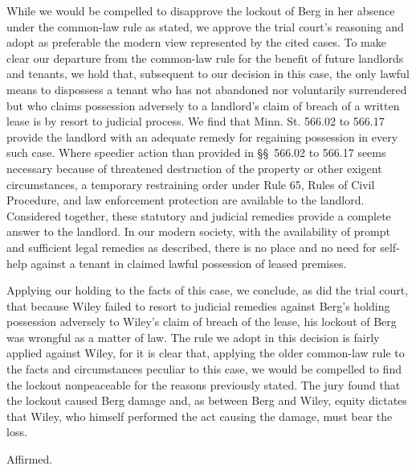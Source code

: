 While we would be compelled to disapprove the lockout of Berg in her absence
under the common-law rule as stated, we approve the trial court's reasoning and
adopt as preferable the modern view represented by the cited cases. To make
clear our departure from the common-law rule for the benefit of future
landlords and tenants, we hold that, subsequent to our decision in this case,
the only lawful means to dispossess a tenant who has not abandoned nor
voluntarily surrendered but who claims possession adversely to a landlord's
claim of breach of a written lease is by resort to judicial process. We find
that Minn. St. 566.02 to 566.17 provide the landlord with an adequate remedy for
regaining possession in every such case. Where speedier action than provided in
\S\S~566.02 to 566.17 seems necessary because of threatened
destruction of the property or other exigent circumstances, a temporary
restraining order under Rule 65, Rules of Civil Procedure, and law enforcement
protection are available to the landlord. Considered together, these statutory
and judicial remedies provide a complete answer to the landlord. In our modern
society, with the availability of prompt and sufficient legal remedies as
described, there is no place and no need for self-help against a tenant in
claimed lawful possession of leased premises.

Applying our holding to the facts of this case, we conclude, as did the trial
court, that because Wiley failed to resort to judicial remedies against Berg's
holding possession adversely to Wiley's claim of breach of the lease, his
lockout of Berg was wrongful as a matter of law. The rule we adopt in this
decision is fairly applied against Wiley, for it is clear that, applying the
older common-law rule to the facts and circumstances peculiar to this case, we
would be compelled to find the lockout nonpeaceable for the reasons previously
stated. The jury found that the lockout caused Berg damage and, as between Berg
and Wiley, equity dictates that Wiley, who himself performed the act causing
the damage, must bear the loss. 

Affirmed.

